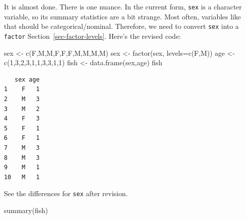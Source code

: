 \documentclass[
  letterpaper,
  DIV=11,
  numbers=noendperiod]{scrreprt}
\newenvironment{Shaded}{\begin{snugshade}}{\end{snugshade}}
\newcommand{\AttributeTok}[1]{\textcolor[rgb]{0.40,0.45,0.13}{#1}}
\newcommand{\DecValTok}[1]{\textcolor[rgb]{0.68,0.00,0.00}{#1}}
\newcommand{\FunctionTok}[1]{\textcolor[rgb]{0.28,0.35,0.67}{#1}}
\newcommand{\NormalTok}[1]{\textcolor[rgb]{0.00,0.23,0.31}{#1}}
\newcommand{\OtherTok}[1]{\textcolor[rgb]{0.00,0.23,0.31}{#1}}
\newcommand{\StringTok}[1]{\textcolor[rgb]{0.13,0.47,0.30}{#1}}
\begin{document}
It is almost done. There is one nuance. In the current form,
\texttt{sex} is a character variable, so its summary statistics are a
bit strange. Most often, variables like that should be
categorical/nominal. Therefore, we need to convert \texttt{sex} into a
\texttt{factor} Section~\ref{sec-factor-levels}. Here's the revised
code:

\begin{Shaded}
\begin{Highlighting}[]
\NormalTok{sex }\OtherTok{\textless{}{-}} \FunctionTok{c}\NormalTok{(}\StringTok{\textquotesingle{}F\textquotesingle{}}\NormalTok{,}\StringTok{\textquotesingle{}M\textquotesingle{}}\NormalTok{,}\StringTok{\textquotesingle{}M\textquotesingle{}}\NormalTok{,}\StringTok{\textquotesingle{}F\textquotesingle{}}\NormalTok{,}\StringTok{\textquotesingle{}F\textquotesingle{}}\NormalTok{,}\StringTok{\textquotesingle{}F\textquotesingle{}}\NormalTok{,}\StringTok{\textquotesingle{}M\textquotesingle{}}\NormalTok{,}\StringTok{\textquotesingle{}M\textquotesingle{}}\NormalTok{,}\StringTok{\textquotesingle{}M\textquotesingle{}}\NormalTok{,}\StringTok{\textquotesingle{}M\textquotesingle{}}\NormalTok{)}
\NormalTok{sex }\OtherTok{\textless{}{-}} \FunctionTok{factor}\NormalTok{(sex, }\AttributeTok{levels=}\FunctionTok{c}\NormalTok{(}\StringTok{\textquotesingle{}F\textquotesingle{}}\NormalTok{,}\StringTok{\textquotesingle{}M\textquotesingle{}}\NormalTok{))}
\NormalTok{age }\OtherTok{\textless{}{-}} \FunctionTok{c}\NormalTok{(}\DecValTok{1}\NormalTok{,}\DecValTok{3}\NormalTok{,}\DecValTok{2}\NormalTok{,}\DecValTok{3}\NormalTok{,}\DecValTok{1}\NormalTok{,}\DecValTok{1}\NormalTok{,}\DecValTok{3}\NormalTok{,}\DecValTok{3}\NormalTok{,}\DecValTok{1}\NormalTok{,}\DecValTok{1}\NormalTok{)}
\NormalTok{fish }\OtherTok{\textless{}{-}} \FunctionTok{data.frame}\NormalTok{(sex,age)}
\NormalTok{fish}
\end{Highlighting}
\end{Shaded}

\begin{verbatim}
   sex age
1    F   1
2    M   3
3    M   2
4    F   3
5    F   1
6    F   1
7    M   3
8    M   3
9    M   1
10   M   1
\end{verbatim}

See the differences for \texttt{sex} after revision.

\begin{Shaded}
\begin{Highlighting}[]
\FunctionTok{summary}\NormalTok{(fish)}
\end{Highlighting}
\end{Shaded}
\end{document}
